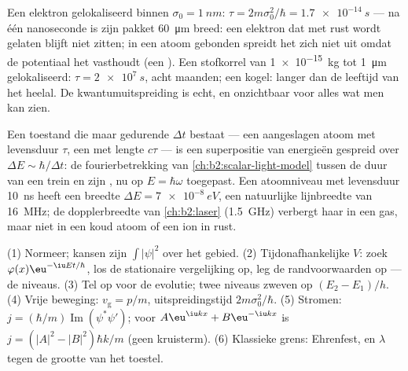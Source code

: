 \begin{example}\label{ex:b2:schrodinger-wave-functions:spreading}
Een elektron gelokaliseerd binnen $\sigma_0 = \qty{1}{nm}$:
$\tau = 2m\sigma_0^2/\hbar
= \qty{1.7e-14}{s}$ --- na één nanoseconde is
zijn pakket \qty{60}{\micro m}
breed: een elektron dat met rust wordt gelaten blijft niet zitten; in een
atoom gebonden
spreidt het zich niet uit omdat de potentiaal het vasthoudt (een ).
Een stofkorrel van \qty{1e-15}{kg} tot \qty{1}{\micro m} gelokaliseerd:
$\tau =
\qty{2e7}{s}$, acht maanden; een kogel: langer dan de leeftijd van
het heelal.
De kwantumuitspreiding is echt, en onzichtbaar voor alles wat men kan zien.
\end{example}

\begin{remark}\label{rem:b2:schrodinger-wave-functions:energytime}
Een toestand die maar gedurende $\Delta t$ bestaat --- een aangeslagen atoom
met levensduur
$\tau$, een  met lengte $c\tau$ --- is een superpositie van energieën
gespreid over $\Delta E \sim \hbar/\Delta t$: de fourierbetrekking van
\cref{ch:b2:scalar-light-model} tussen de duur van een trein en zijn
, nu op $E = \hbar\omega$ toegepast. Een atoomniveau met
levensduur \qty{10}{ns} heeft een breedte $\Delta E = \qty{7e-8}{eV}$, een
natuurlijke
lijnbreedte van \qty{16}{MHz}; de dopplerbreedte van \cref{ch:b2:laser}
(\qty{1.5}{GHz}) verbergt haar in een gas, maar niet in een koud atoom of een ion in
rust.
\end{remark}

\begin{method}\label{meth:b2:schrodinger-wave-functions:method}
(1) Normeer; kansen zijn $\int|\psi|^2$ over het gebied. (2)
Tijdonafhankelijke $V$: zoek $\varphi(x)\eu^{-\iu Et/\hbar}$, los de
stationaire vergelijking op, leg de randvoorwaarden op --- de niveaus.
(3) Tel  op voor de evolutie; twee niveaus zweven op
$(E_2 - E_1)/h$. (4) Vrije beweging: $v_{\text{g}} = p/m$, uitspreidingstijd
$2m\sigma_0^2/\hbar$. (5) Stromen: $j = (\hbar/m)\operatorname{Im}(\psi^*\psi')$;
voor $A\eu^{\iu kx} + B\eu^{-\iu kx}$ is $j = (|A|^2 - |B|^2)\hbar k/m$
(geen kruisterm).
(6) Klassieke grens: Ehrenfest, en $\lambda$ tegen de grootte van het
toestel.
\end{method}


